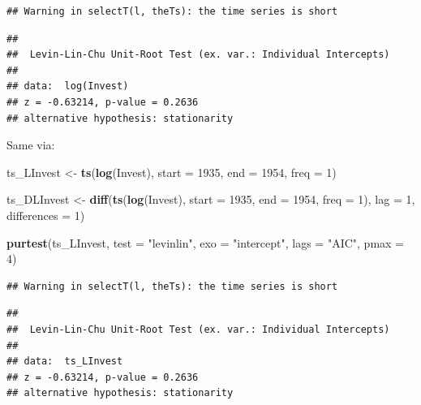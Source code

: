 \documentclass[
]{book}
\newenvironment{Shaded}{\begin{snugshade}}{\end{snugshade}}
\newcommand{\AttributeTok}[1]{\textcolor[rgb]{0.13,0.29,0.53}{#1}}
\newcommand{\DecValTok}[1]{\textcolor[rgb]{0.00,0.00,0.81}{#1}}
\newcommand{\FunctionTok}[1]{\textcolor[rgb]{0.13,0.29,0.53}{\textbf{#1}}}
\newcommand{\NormalTok}[1]{#1}
\newcommand{\OtherTok}[1]{\textcolor[rgb]{0.56,0.35,0.01}{#1}}
\newcommand{\StringTok}[1]{\textcolor[rgb]{0.31,0.60,0.02}{#1}}
\begin{document}
\begin{verbatim}
## Warning in selectT(l, theTs): the time series is short
\end{verbatim}

\begin{verbatim}
## 
##  Levin-Lin-Chu Unit-Root Test (ex. var.: Individual Intercepts)
## 
## data:  log(Invest)
## z = -0.63214, p-value = 0.2636
## alternative hypothesis: stationarity
\end{verbatim}

Same via:

\begin{Shaded}
\begin{Highlighting}[]
\NormalTok{ts\_LInvest }\OtherTok{\textless{}{-}} \FunctionTok{ts}\NormalTok{(}\FunctionTok{log}\NormalTok{(Invest), }\AttributeTok{start =} \DecValTok{1935}\NormalTok{, }\AttributeTok{end =} \DecValTok{1954}\NormalTok{, }\AttributeTok{freq =} \DecValTok{1}\NormalTok{)}

\NormalTok{ts\_DLInvest }\OtherTok{\textless{}{-}} \FunctionTok{diff}\NormalTok{(}\FunctionTok{ts}\NormalTok{(}\FunctionTok{log}\NormalTok{(Invest), }\AttributeTok{start =} \DecValTok{1935}\NormalTok{, }\AttributeTok{end =} \DecValTok{1954}\NormalTok{, }\AttributeTok{freq =} \DecValTok{1}\NormalTok{), }
                     \AttributeTok{lag =} \DecValTok{1}\NormalTok{, }\AttributeTok{differences =} \DecValTok{1}\NormalTok{)}
\end{Highlighting}
\end{Shaded}

\begin{Shaded}
\begin{Highlighting}[]
\FunctionTok{purtest}\NormalTok{(ts\_LInvest, }\AttributeTok{test =} \StringTok{"levinlin"}\NormalTok{, }\AttributeTok{exo =} \StringTok{"intercept"}\NormalTok{, }
        \AttributeTok{lags =} \StringTok{"AIC"}\NormalTok{, }\AttributeTok{pmax =} \DecValTok{4}\NormalTok{)}
\end{Highlighting}
\end{Shaded}

\begin{verbatim}
## Warning in selectT(l, theTs): the time series is short
\end{verbatim}

\begin{verbatim}
## 
##  Levin-Lin-Chu Unit-Root Test (ex. var.: Individual Intercepts)
## 
## data:  ts_LInvest
## z = -0.63214, p-value = 0.2636
## alternative hypothesis: stationarity
\end{verbatim}
\end{document}
